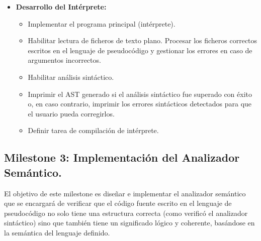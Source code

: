 \begin{itemize}
    \item \textbf{Desarrollo del Intérprete:}
    \begin{itemize}
        \item Implementar el programa principal (intérprete).
        \item Habilitar lectura de ficheros de texto plano. Procesar los ficheros correctos escritos en el lenguaje de pseudocódigo y gestionar los errores en caso de argumentos incorrectos.
        \item Habilitar análisis sintáctico.
        \item Imprimir el AST generado si el análisis sintáctico fue superado con éxito o, en caso contrario, imprimir los errores sintácticos detectados para que el usuario pueda corregirlos.
        \item Definir tarea de compilación de intérprete.
    \end{itemize}
\end{itemize}

\subsection{Milestone 3: Implementación del Analizador Semántico.}
El objetivo de este milestone es diseñar e implementar el analizador semántico que se encargará de verificar que el código fuente escrito en el lenguaje de pseudocódigo no solo tiene una estructura correcta (como verificó el analizador sintáctico) sino que también tiene un significado lógico y coherente, basándose en la semántica del lenguaje definido.

